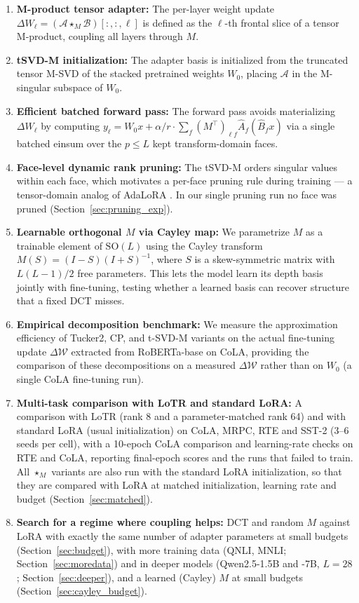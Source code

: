 \documentclass{article}
\newcommand{\cA}{\mathcal{A}}
\newcommand{\cB}{\mathcal{B}}
\newcommand{\mprod}{\star_M}
\newcommand{\DeltaW}{\Delta\mathcal{W}}
\theoremstyle{plain}
\begin{document}
\begin{enumerate}
  \item \textbf{M-product tensor adapter:} The per-layer weight update
        $\Delta W_\ell = (\cA \mprod \cB)[:,:,\ell]$ is defined as the $\ell$-th
        frontal slice of a tensor M-product, coupling all layers through $M$.
  \item \textbf{tSVD-M initialization:} The adapter basis is initialized from the
        truncated tensor M-SVD of the stacked pretrained weights $W_0$, placing
        $\cA$ in the M-singular subspace of $W_0$.
  \item \textbf{Efficient batched forward pass:} The forward pass avoids
        materializing $\Delta W_\ell$ by computing
        $y_\ell = W_0 x + \alpha/r \cdot \sum_f (M^\top)_{\ell f} \hat{A}_f (\hat{B}_f x)$
        via a single batched einsum over the $p \leq L$ kept transform-domain faces.
  \item \textbf{Face-level dynamic rank pruning:} The tSVD-M orders singular values
        within each face, which motivates a per-face pruning rule during
        training — a tensor-domain analog of AdaLoRA \citep{zhang2023adalora}.
        In our single pruning run no face was pruned (Section~\ref{sec:pruning_exp}).
  \item \textbf{Learnable orthogonal $M$ via Cayley map:} We parametrize $M$ as
        a trainable element of $\mathrm{SO}(L)$ using the Cayley transform
        $M(S) = (I-S)(I+S)^{-1}$, where $S$ is a skew-symmetric matrix with
        $L(L{-}1)/2$ free parameters.
        This lets the model learn its depth basis jointly with fine-tuning, testing whether
        a learned basis can recover structure that a fixed DCT misses.
  \item \textbf{Empirical decomposition benchmark:} We measure the approximation
        efficiency of Tucker2, CP, and t-SVD-M variants on the actual fine-tuning
        update $\DeltaW$ extracted from RoBERTa-base on CoLA, providing the
        comparison of these decompositions on a measured $\DeltaW$ rather than on $W_0$
        (a single CoLA fine-tuning run).
  \item \textbf{Multi-task comparison with LoTR and standard LoRA:} A comparison with LoTR (rank 8 and a
        parameter-matched rank 64) and with standard LoRA (usual initialization) on CoLA, MRPC, RTE and SST-2 (3--6 seeds per cell),
        with a 10-epoch CoLA comparison and learning-rate checks on RTE and CoLA,
        reporting final-epoch scores and the runs that failed to train.
        All $\star_M$ variants are also run with the standard LoRA initialization, so that they are compared with LoRA at matched
        initialization, learning rate and budget (Section~\ref{sec:matched}).
  \item \textbf{Search for a regime where coupling helps:} DCT and random $M$ against LoRA with exactly the same number of adapter parameters
        at small budgets (Section~\ref{sec:budget}), with more training data (QNLI, MNLI; Section~\ref{sec:moredata}) and in deeper models
        (Qwen2.5-1.5B and -7B, $L=28$; Section~\ref{sec:deeper}), and a learned (Cayley) $M$ at small budgets (Section~\ref{sec:cayley_budget}).
\end{enumerate}
\end{document}
